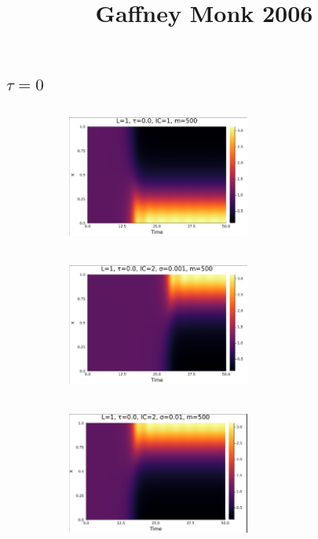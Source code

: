 \documentclass[12pt,a4paper]{article}
\title{Gaffney Monk 2006}
\author{}
\begin{document}
\maketitle
\thispagestyle{empty}
\newpage
\setcounter{page}{1}
\newpage

\subsection{$\tau=0$}
\begin{figure}[H]
    \centering
    \begin{subfigure}[b]{0.45\linewidth}
        \centering
        \includegraphics[width=6cm,height = 4.5cm]{l1t0ic1.png}
        \caption{}
        \label{}
    \end{subfigure}
    \hfill
    \begin{subfigure}[b]{0.45\linewidth}
        \centering
        \includegraphics[width=6cm,height = 4.5cm]{l1t0ic2s1e3.png}
        \caption{}
        \label{}
    \end{subfigure}
    \hfill
    \begin{subfigure}[b]{0.45\linewidth}
        \centering
        \includegraphics[width=6cm,height = 4.5cm]{l1t0ic2s1e2.png}

\end{subfigure}
\end{figure}
\end{document}
